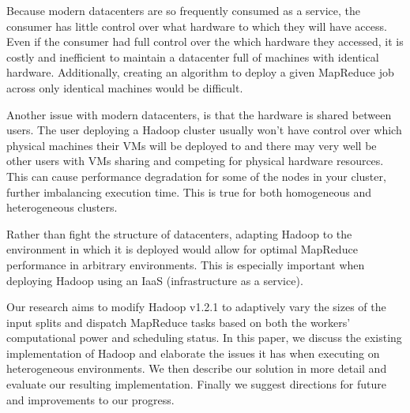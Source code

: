 \documentclass{sig-alternate}
\begin{document}
Because modern datacenters are so frequently consumed as a service, the consumer
has little control over what hardware to which they will have access. Even if the
consumer had full control over the which hardware they accessed, it is costly and
inefficient to maintain a datacenter full of machines with identical hardware.
Additionally, creating an algorithm to deploy a given MapReduce job across only
identical machines would be difficult.

Another issue with modern datacenters, is that the hardware is shared between users.
The user deploying a Hadoop cluster usually won't have control over which physical
machines their VMs will be deployed to and there may very well be other users with
VMs sharing and competing for physical hardware resources. This can cause performance
degradation for some of the nodes in your cluster, further imbalancing execution time.
This is true for both homogeneous and heterogeneous clusters.

Rather than fight the structure of datacenters, adapting Hadoop to the environment
in which it is deployed would allow for optimal MapReduce performance in arbitrary
environments. This is especially important when deploying Hadoop using an IaaS
(infrastructure as a service).

Our research aims to modify Hadoop v1.2.1 to adaptively vary the sizes of the input
splits and dispatch MapReduce tasks based on both the workers' computational power
and scheduling status. In this paper, we discuss the existing implementation of Hadoop
and elaborate the issues it has when executing on heterogeneous environments. We then
describe our solution in more detail and evaluate our resulting implementation. Finally
we suggest directions for future and improvements to our progress.








{}

\end{document}
